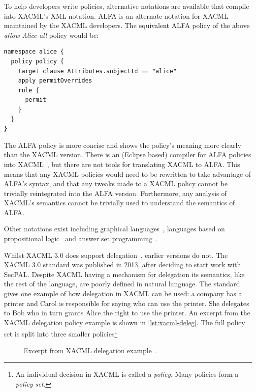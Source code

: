 \documentclass[thesis.tex]{subfiles}
\begin{document}
To help developers write policies, alternative notations are available that
compile into XACML's XML notation. ALFA is an alternate notation for
XACML~\cite{oasis_xacml_technical_comitee_abbreviated_2015} maintained by the
XACML developers. The equivalent ALFA policy of the above \emph{allow Alice all}
policy would be:

\noindent\begin{minipage}{\linewidth}
\begin{lstlisting}
namespace alice {
  policy policy {
    target clause Attributes.subjectId == "alice"
    apply permitOverrides
    rule {
      permit
    }
  }
}
\end{lstlisting}
\end{minipage}

The ALFA policy is more concise and shows the
policy's meaning more clearly than the XACML version.
There is an (Eclipse based) compiler for ALFA policies into
XACML~\cite{axiomaics_axiomatics_2012}, but there are not tools for
translating XACML to ALFA.  This means that any XACML policies would
need to be rewritten to take advantage of ALFA's syntax, and that any
tweaks made to a XACML policy cannot be trivially reintegrated into
the ALFA version.  Furthermore, any analysis of XACML's semantics cannot
be trivially used to understand the semantics of ALFA.

Other notations exist including graphical
languages~\cite{henrik_nergaard_scratch-based_2015}, languages based on
propositional logic~\cite{zhang_synthesising_2004} and answer set
programming~\cite{ramli_xacml_2012}.

Whilst XACML 3.0 does support delegation~\cite{oasis_xacml_2010}, earlier
versions do not. The XACML 3.0 standard was published in 2013, after deciding to
start work with SecPAL. Despite XACML having a mechanism for delegation its
semantics, like the rest of the language, are poorly defined in natural
language. The standard gives one example of how delegation in XACML can be used:
a company has a printer and Carol is responsible for saying who can use the
printer. She delegates to Bob who in turn grants Alice the right to use the
printer. An excerpt from the XACML delegation policy example is shown in
\autoref{lst:xacml-deleg}. The full policy set is split into three smaller
policies\footnote{An individual decision in XACML is called a \emph{policy}. Many policies form a \emph{policy set}.}

\begin{figure}
  \begin{minipage}{1\textwidth}
      
  \end{minipage}
  \caption[Excerpt from XACML delegation example.]{Excerpt from XACML delegation example~\cite{oasis_xacml_2010}.}
  \label{lst:xacml-deleg}
\end{figure}
\end{document}
